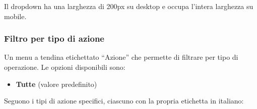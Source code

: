 \documentclass[a4paper,11pt,oneside]{book}
\begin{document}
Il dropdown ha una larghezza di 200px su desktop e occupa l'intera larghezza su mobile.

\subsubsection{Filtro per tipo di azione}

Un menu a tendina etichettato ``Azione'' che permette di filtrare per tipo di operazione. Le opzioni disponibili sono:

\begin{itemize}[leftmargin=1.5em]
  \item \textbf{Tutte} (valore predefinito)
\end{itemize}

Seguono i tipi di azione specifici, ciascuno con la propria etichetta in italiano:
\end{document}
